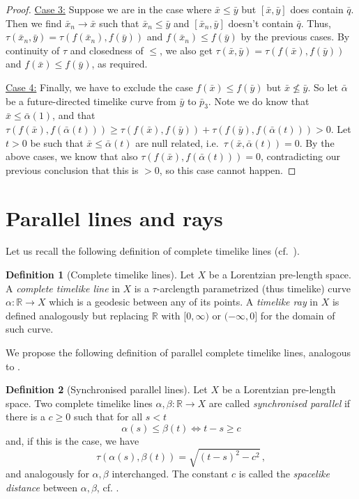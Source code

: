 \documentclass[11pt,reqno]{amsart}
\theoremstyle{definition}
\theoremstyle{definition}
\newtheorem{dfn}{Definition}[section]
\theoremstyle{plain}
\theoremstyle{remark}
\newcommand{\R}{\mathbb R}
\newcommand{\LpLSn}{Lorentzian pre-length space}
\begin{document}
\begin{proof}
\underline{Case 3:} 
Suppose we are in the case where $\bar x\leq\bar y$ but $[\bar x,\bar y]$ does contain $\bar q$. Then we find $\bar x_n\to\bar x$ such that $\bar x_n\leq \bar y$ and $[\bar x_n,\bar y]$ doesn't contain $\bar q$. Thus, $\tau(\bar x_n,\bar y)=\tau(f(\bar x_n),f(\bar y))$ and $f(\bar x_n)\leq f(\bar y)$ by the previous cases. By continuity of $\tau$ and closedness of $\leq$, we also get $\tau(\bar x,\bar y)=\tau(f(\bar x),f(\bar y))$ and $f(\bar x)\leq f(\bar y)$, as required.

\underline{Case 4:} Finally, we have to exclude the case $f(\bar x)\leq f(\bar y)$ but $\bar x\not\leq\bar y$. So let $\bar\alpha$ be a future-directed timelike curve from $\bar y$ to $\bar p_3$. Note we do know that $\bar x\leq \bar\alpha(1)$, and that $\tau(f(\bar x),f(\bar\alpha(t)))\geq\tau(f(\bar x),f(\bar y))+\tau(f(\bar y),f(\bar\alpha(t)))>0$. Let $t>0$ be such that $\bar x\leq\bar\alpha(t)$ are null related, i.e.\ $\tau(\bar x,\bar\alpha(t))=0$. By the above cases, we know that also $\tau(f(\bar x),f(\bar\alpha(t)))=0$, contradicting our previous conclusion that this is $>0$, so this case cannot happen.
\end{proof}




\section{Parallel lines and rays}
Let us recall the following definition of complete timelike lines (cf.\ \cite[Definition 4.1]{BORS23}).
\begin{dfn}[Complete timelike lines]
Let $X$ be a \LpLSn. A \emph{complete timelike line} in $X$ is a $\tau$-arclength parametrized (thus timelike) curve $\alpha\colon \mathbb{R}\to X$ which is a geodesic between any of its points. A \emph{timelike ray} in $X$ is defined analogously but replacing $\mathbb{R}$ with $[0,\infty)$ or $(-\infty,0]$ for the domain of such curve.
\end{dfn}


We propose the following definition of parallel complete timelike lines, analogous to \cite[Definition 10.5.3]{burago-burago-ivanov2001}. 

\begin{dfn}[Synchronised parallel lines]
\label{dfn:synchronisedparallel}
Let $X$ be a \LpLSn. Two complete timelike lines $\alpha,\beta:\R\to X$ are called \emph{synchronised parallel} if there is a $c\geq0$ such that for all $s<t$
\[\alpha(s)\leq\beta(t) \Leftrightarrow t-s\geq c\]
and, if this is the case, we have
\[
\tau(\alpha(s),\beta(t))=\sqrt{(t-s)^2-c^2} \, ,
\]
and analogously for $\alpha,\beta$ interchanged.
The constant $c$ is called the \emph{spacelike distance} between $\alpha,\beta$, cf. \cite{BORS23}.
\end{dfn}
\end{document}
